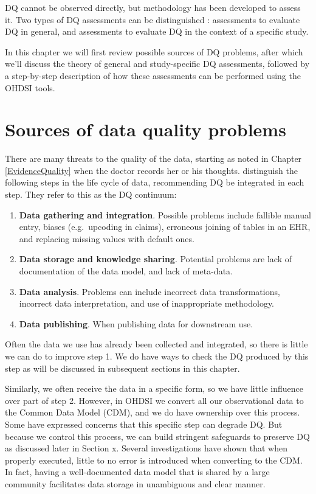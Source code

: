 \documentclass[11pt]{book}
\providecommand{\tightlist}{%
  \setlength{\itemsep}{0pt}\setlength{\parskip}{0pt}}
\theoremstyle{definition}
\theoremstyle{definition}
\theoremstyle{definition}
\theoremstyle{remark}
\begin{document}
DQ cannot be observed directly, but methodology has been developed to assess it. Two types of DQ assessments can be distinguished \citep{weiskopf_methods_2013}: assessments to evaluate DQ in general, and assessments to evaluate DQ in the context of a specific study.

In this chapter we will first review possible sources of DQ problems, after which we'll discuss the theory of general and study-specific DQ assessments, followed by a step-by-step description of how these assessments can be performed using the OHDSI tools.

\hypertarget{sources-of-data-quality-problems}{%
\section{Sources of data quality problems}\label{sources-of-data-quality-problems}}

There are many threats to the quality of the data, starting as noted in Chapter \ref{EvidenceQuality} when the doctor records her or his thoughts. \citet{dasu_2003} distinguish the following steps in the life cycle of data, recommending DQ be integrated in each step. They refer to this as the DQ continuum:

\begin{enumerate}
\def\labelenumi{\arabic{enumi}.}
\tightlist
\item
  \textbf{Data gathering and integration}. Possible problems include fallible manual entry, biases (e.g.~upcoding in claims), erroneous joining of tables in an EHR, and replacing missing values with default ones.
\item
  \textbf{Data storage and knowledge sharing}. Potential problems are lack of documentation of the data model, and lack of meta-data.
\item
  \textbf{Data analysis}. Problems can include incorrect data transformations, incorrect data interpretation, and use of inappropriate methodology.
\item
  \textbf{Data publishing}. When publishing data for downstream use.
\end{enumerate}

Often the data we use has already been collected and integrated, so there is little we can do to improve step 1. We do have ways to check the DQ produced by this step as will be discussed in subsequent sections in this chapter.

Similarly, we often receive the data in a specific form, so we have little influence over part of step 2. However, in OHDSI we convert all our observational data to the Common Data Model (CDM), and we do have ownership over this process. Some have expressed concerns that this specific step can degrade DQ. But because we control this process, we can build stringent safeguards to preserve DQ as discussed later in Section x. Several investigations \citep{defalco_2013, makadia_2014, matcho_2014, voss_2015, voss_2015b, hripcsak_2018} have shown that when properly executed, little to no error is introduced when converting to the CDM. In fact, having a well-documented data model that is shared by a large community facilitates data storage in unambiguous and clear manner.
\end{document}
